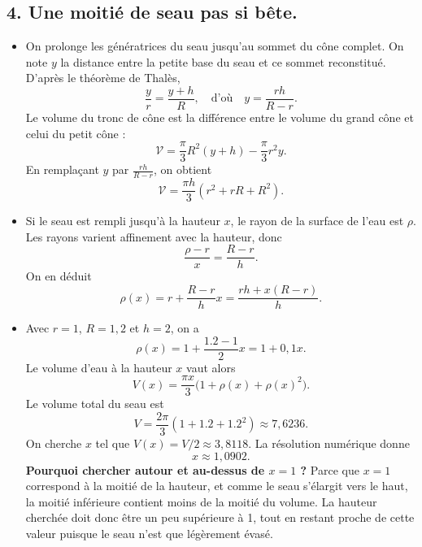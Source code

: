 \subsection*{4. Une moitié de seau pas si bête.}
\begin{itemize}
    \item On prolonge les génératrices du seau jusqu'au sommet du cône complet. On note \(y\) la distance entre la petite base du seau et ce sommet reconstitué.
    D'après le théorème de Thalès,
    \[\frac{y}{r} = \frac{y + h}{R},\quad\text{d'où}\quad y = \frac{rh}{R - r}.\]
    Le volume du tronc de cône est la différence entre le volume du grand cône et celui du petit cône :
    \[\mathcal{V} = \frac{\pi}{3}R^2(y + h) - \frac{\pi}{3}r^2y.\]
    En remplaçant \(y\) par \(\frac{rh}{R - r}\), on obtient
    \[\boxed{\mathcal{V} = \frac{\pi h}{3}(r^2 + rR + R^2)}.\]

    \item Si le seau est rempli jusqu'à la hauteur \(x\), le rayon de la surface de l'eau est \(\rho\). Les rayons varient affinement avec la hauteur, donc
    \[\frac{\rho - r}{x} = \frac{R - r}{h}.\]
    On en déduit
    \[\rho(x) = r + \frac{R - r}{h}x = \frac{rh + x(R - r)}{h}.\]

    \item Avec \(r = 1\), \(R = 1,2\) et \(h = 2\), on a
    \[\rho(x) = 1 + \frac{1.2 - 1}{2}x = 1 + 0,1x.\]
    Le volume d'eau à la hauteur \(x\) vaut alors
    \[V(x) = \frac{\pi x}{3}\bigl(1 + \rho(x) + \rho(x)^2\bigr).\]
    Le volume total du seau est
    \[V = \frac{2\pi}{3}(1 + 1.2 + 1.2^2) \approx 7,6236.\]
    On cherche \(x\) tel que \(V(x) = V/2 \approx 3,8118\). La résolution numérique donne
    \[x \approx 1,0902.\]
    \textbf{Pourquoi chercher autour et au-dessus de \(x = 1\) ?} Parce que \(x = 1\) correspond à la moitié de la hauteur, et comme le seau s’élargit vers le haut, la moitié inférieure contient moins de la moitié du volume. La hauteur cherchée doit donc être un peu supérieure à 1, tout en restant proche de cette valeur puisque le seau n’est que légèrement évasé.
\end{itemize}

